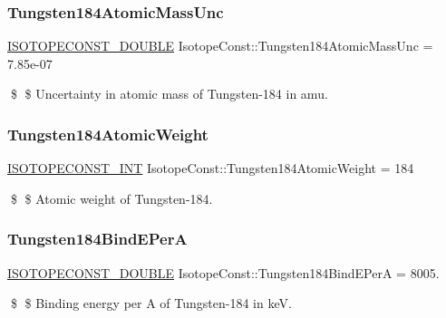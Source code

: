 \subsubsection{\texorpdfstring{Tungsten184\+Atomic\+Mass\+Unc}{Tungsten184AtomicMassUnc}}
{\footnotesize\ttfamily \mbox{\hyperlink{group___isotope_const-_macros_ga8f45a7272ce02c0b4c65c44636ed719a}{I\+S\+O\+T\+O\+P\+E\+C\+O\+N\+S\+T\+\_\+\+D\+O\+U\+B\+LE}} Isotope\+Const\+::\+Tungsten184\+Atomic\+Mass\+Unc = 7.\+85e-\/07}

\$ \$ Uncertainty in atomic mass of Tungsten-\/184 in amu. \mbox{\label{group___isotope_const-_tungsten-_w184_gaed13250ae0173bf27c4b5a08589e716f}} 
\subsubsection{\texorpdfstring{Tungsten184\+Atomic\+Weight}{Tungsten184AtomicWeight}}
{\footnotesize\ttfamily \mbox{\hyperlink{group___isotope_const-_macros_ga5f18360b3e99483a35c32d789e62621c}{I\+S\+O\+T\+O\+P\+E\+C\+O\+N\+S\+T\+\_\+\+I\+NT}} Isotope\+Const\+::\+Tungsten184\+Atomic\+Weight = 184}

\$ \$ Atomic weight of Tungsten-\/184. \mbox{\label{group___isotope_const-_tungsten-_w184_ga3afe3b06f25093ebcd51fe424e5f0de2}} 
\subsubsection{\texorpdfstring{Tungsten184\+Bind\+E\+PerA}{Tungsten184BindEPerA}}
{\footnotesize\ttfamily \mbox{\hyperlink{group___isotope_const-_macros_ga8f45a7272ce02c0b4c65c44636ed719a}{I\+S\+O\+T\+O\+P\+E\+C\+O\+N\+S\+T\+\_\+\+D\+O\+U\+B\+LE}} Isotope\+Const\+::\+Tungsten184\+Bind\+E\+PerA = 8005.}

\$ \$ Binding energy per A of Tungsten-\/184 in keV. \mbox{\label{group___isotope_const-_tungsten-_w184_ga9be5637ec2c170ada0283973f230a0af}} 
